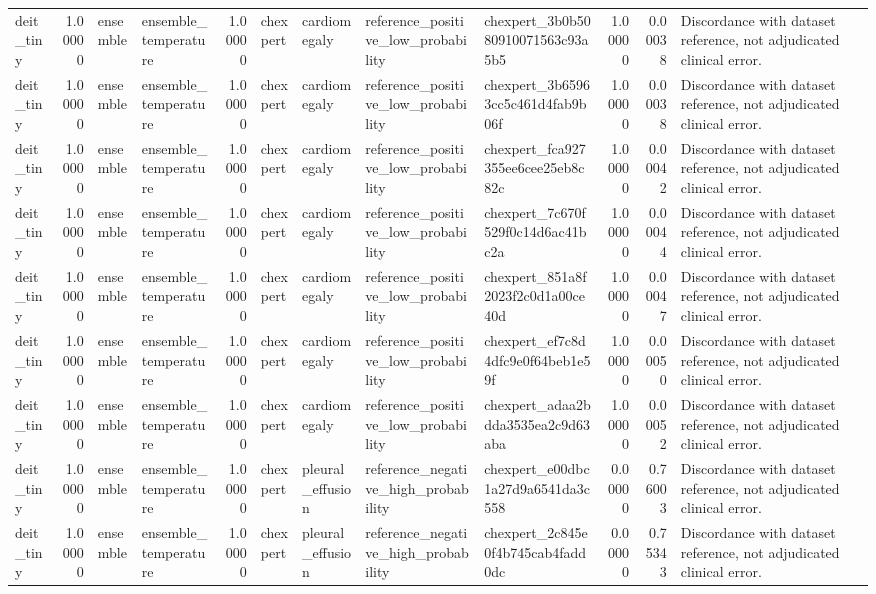\begin{tabular}{lrllrllllrrl}
deit\_tiny & 1.00000 & ensemble & ensemble\_temperature & 1.00000 & chexpert & cardiomegaly & reference\_positive\_low\_probability & chexpert\_3b0b5080910071563c93a5b5 & 1.00000 & 0.00038 & Discordance with dataset reference, not adjudicated clinical error. \\
deit\_tiny & 1.00000 & ensemble & ensemble\_temperature & 1.00000 & chexpert & cardiomegaly & reference\_positive\_low\_probability & chexpert\_3b65963cc5c461d4fab9b06f & 1.00000 & 0.00038 & Discordance with dataset reference, not adjudicated clinical error. \\
deit\_tiny & 1.00000 & ensemble & ensemble\_temperature & 1.00000 & chexpert & cardiomegaly & reference\_positive\_low\_probability & chexpert\_fca927355ee6cee25eb8c82c & 1.00000 & 0.00042 & Discordance with dataset reference, not adjudicated clinical error. \\
deit\_tiny & 1.00000 & ensemble & ensemble\_temperature & 1.00000 & chexpert & cardiomegaly & reference\_positive\_low\_probability & chexpert\_7c670f529f0c14d6ac41bc2a & 1.00000 & 0.00044 & Discordance with dataset reference, not adjudicated clinical error. \\
deit\_tiny & 1.00000 & ensemble & ensemble\_temperature & 1.00000 & chexpert & cardiomegaly & reference\_positive\_low\_probability & chexpert\_851a8f2023f2c0d1a00ce40d & 1.00000 & 0.00047 & Discordance with dataset reference, not adjudicated clinical error. \\
deit\_tiny & 1.00000 & ensemble & ensemble\_temperature & 1.00000 & chexpert & cardiomegaly & reference\_positive\_low\_probability & chexpert\_ef7c8d4dfc9e0f64beb1e59f & 1.00000 & 0.00050 & Discordance with dataset reference, not adjudicated clinical error. \\
deit\_tiny & 1.00000 & ensemble & ensemble\_temperature & 1.00000 & chexpert & cardiomegaly & reference\_positive\_low\_probability & chexpert\_adaa2bdda3535ea2c9d63aba & 1.00000 & 0.00052 & Discordance with dataset reference, not adjudicated clinical error. \\
deit\_tiny & 1.00000 & ensemble & ensemble\_temperature & 1.00000 & chexpert & pleural\_effusion & reference\_negative\_high\_probability & chexpert\_e00dbc1a27d9a6541da3c558 & 0.00000 & 0.76003 & Discordance with dataset reference, not adjudicated clinical error. \\
deit\_tiny & 1.00000 & ensemble & ensemble\_temperature & 1.00000 & chexpert & pleural\_effusion & reference\_negative\_high\_probability & chexpert\_2c845e0f4b745cab4fadd0dc & 0.00000 & 0.75343 & Discordance with dataset reference, not adjudicated clinical error. \\

\end{tabular}
